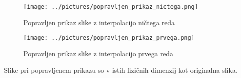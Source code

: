 \documentclass[12pt,a4paper]{article}
\begin{document}
\pagebreak

\begin{figure}[hbtp]
\centering
\texttt{[image: ../pictures/popravljen\_prikaz\_nictega.png]}
\caption{Popravljen prikaz slike z interpolacijo ničtega reda}
\end{figure}

\begin{figure}[hbtp]
\centering
\texttt{[image: ../pictures/popravljen\_prikaz\_prvega.png]}
\caption{Popravljen prikaz slike z interpolacijo prvega reda}
\end{figure}
Slike pri popravljenem prikazu so v istih fizičnih dimenzij kot originalna slika. 
\end{document}
